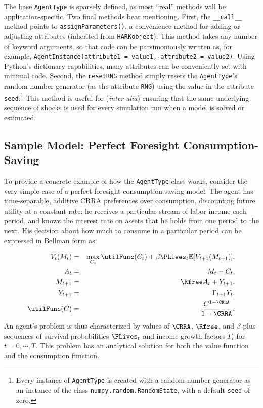 \documentclass[12pt,titlepage,letterpaper]{econtex}
\providecommand{\E}{\mathbb{E}}
\begin{document}
{The base \texttt{AgentType} is sparsely defined, as most ``real'' methods will be application-specific.  Two final methods bear mentioning.  First, the \texttt{\_\_call\_\_} method points to \texttt{assignParameters()}, a convenience method for adding or adjusting attributes (inherited from \texttt{HARKobject}).  This method takes any number of keyword arguments, so that code can be parsimoniously written as, for example, \texttt{AgentInstance(attribute1 = value1, attribute2 = value2)}.  Using Python's dictionary capabilities, many attributes can be conveniently set with minimal code.  Second, the \texttt{resetRNG} method simply resets the \texttt{AgentType}'s random number generator (as the attribute \texttt{RNG}) using the value in the attribute \texttt{seed}.\footnote{Every instance of \texttt{AgentType} is created with a random number generator as an instance of the class \texttt{numpy.random.RandomState}, with a default \texttt{seed} of zero.}  This method is useful for (\textit{inter alia}) ensuring that the same underlying sequence of shocks is used for every simulation run when a model is solved or estimated.


\subsection{Sample Model: Perfect Foresight Consumption-Saving}\label{sec:PerfectForesight}

To provide a concrete example of how the \texttt{AgentType} class works, consider the very simple case of a perfect foresight consumption-saving model.  The agent has time-separable, additive CRRA preferences over consumption, discounting future utility at a constant rate; he receives a particular stream of labor income each period, and knows the interest rate on assets that he holds from one period to the next.  His decision about how much to consume in a particular period can be expressed in Bellman form as:

\begin{eqnarray*}
V_t(M_t) &=& \max_{C_t} \utilFunc(C_t) + \beta \PLives_t \E [V_{t+1}(M_{t+1}) ], \\
A_t &=& M_t - C_t, \\
M_{t+1} &=& \Rfree A_t + Y_{t+1}, \\
Y_{t+1} &=& \Gamma_{t+1} Y_t, \\
\utilFunc(C) &=& \frac{C^{1-\CRRA}}{1-\CRRA}.
\end{eqnarray*}
An agent's problem is thus characterized by values of $\CRRA$, $\Rfree$,  and $\beta$ plus sequences of survival probabilities $\PLives_t$ and income growth factors $\Gamma_t$ for $t=0,\cdots,T$.  This problem has an analytical solution for both the value function and the consumption function.

}
\end{document}
